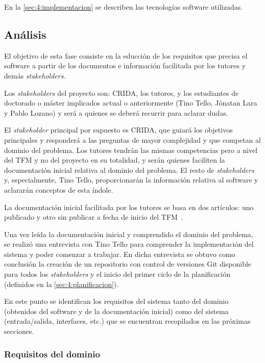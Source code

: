 En la \autoref{sec:4:implementacion} se describen las tecnologías software utilizadas.


\subsection{Análisis}
El objetivo de esta fase consiste en la educción de los requisitos que precisa el software a partir de los documentos e información facilitada por los tutores y demás \textit{stakeholders}.

Los \textit{stakeholders} del proyecto son: CRIDA, los tutores, y los estudiantes de doctorado o máster implicados actual o anteriormente (Tino Tello, Jónatan Lara y Pablo Lozano) y será a quienes se deberá recurrir para aclarar dudas. 

El \textit{stakeholder} principal por supuesto es CRIDA, que guiará los objetivos principales y responderá a las preguntas de mayor complejidad y que competan al dominio del problema. Los tutores tendrán las mismas competencias pero a nivel del TFM y no del proyecto en su totalidad, y serán quienes faciliten la documentación inicial relativa al dominio del problema. El resto de \textit{stakeholders} y, especialmente, Tino Tello, proporcionarán la información relativa al software y aclararán conceptos de esta índole.

La documentación inicial facilitada por los tutores se basa en dos artículos: uno publicado y otro sin publicar a fecha de inicio del TFM~\cite{articulo1, articulo2}. 

Una vez leída la documentación inicial y comprendido el dominio del problema, se realizó una entrevista con Tino Tello para comprender la implementación del sistema \legacy{} y poder comenzar a trabajar. En dicha entrevista se obtuvo como conclusión la creación de un repositorio con control de versiones Git disponible para todos los \textit{stakeholders} y el inicio del primer ciclo de la planificación (definidos en la \autoref{sec:4:planificacion}).

En este punto se identifican los requisitos del sistema tanto del dominio (obtenidos del software \legacy{} y de la documentación inicial) como del sistema (entrada/salida, interfaces, etc.) que se encuentran recopilados en las próximas secciones.

\subsubsection{Requisitos del dominio}
\label{sec:4:RD}

